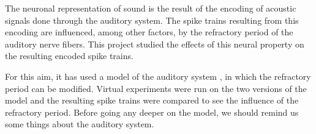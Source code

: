 The neuronal representation of sound is the result of the encoding of acoustic 
signals done through the auditory system. The spike trains resulting from this 
encoding are influenced, among other factors, by the refractory period of the 
auditory nerve fibers. This project studied the effects of this neural property 
on the resulting encoded spike trains.

For this aim, it has used a model of the auditory system 
\cite{Model1, Model2, Model3} , in which the refractory period can be modified. 
Virtual experiments were run on the two versions of the model and the resulting 
spike trains were compared to see the influence of the refractory period. 
Before going any deeper on the model, we should remind us some things 
about the auditory system.


